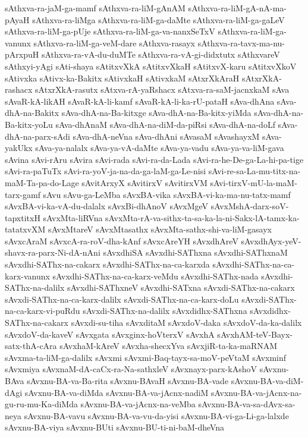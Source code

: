 {sAthxva-ra-jaM-ga-mamf
sAthxva-ra-liM-gAnAM
sAthxva-ra-liM-gA-nA-ma-pAyaH
sAthxva-ra-liMga
sAthxva-ra-liM-ga-daMte
sAthxva-ra-liM-ga-gaLeV
sAthxva-ra-liM-ga-pUje
sAthxva-ra-liM-ga-va-nanxSeTxV
sAthxva-ra-liM-ga-vanunx
sAthxva-ra-liM-ga-veM-dare
sAthxva-rasayx
sAthxva-ra-tavx-ma-nu-pArxpuH
sAthxva-ra-vA-du-duMTe
sAthxva-ra-vA-gi-didxtutx
sAthxvareV
sAthxyi-yAgi
sAti-shaya
sAtitxvXkA
sAtitxvXkaH
sAtitxvX-karu
sAtitxvXkoV
sAtivxka
sAtivx-ka-Bakitx
sAtivxkaH
sAtivxkaM
sAtxrXkAraH
sAtxrXkA-rashacx
sAtxrXkA-rasutx
sAtxva-rA-yaRshacx
sAtxva-ra-saM-jacnxkaM
sAva
sAvaR-kA-likAH
sAvaR-kA-li-kamf
sAvaR-kA-li-ka-rU-pataH
sAva-dhAna
sAva-dhA-na-Bakitx
sAva-dhA-na-Ba-kitxge
sAva-dhA-na-Ba-kitx-yiMda
sAva-dhA-na-Ba-kitx-yoLu
sAva-dhAnaM
sAva-dhA-na-diM-da-piRsi
sAva-dhA-na-doLf
sAva-dhA-na-parx-sAdi
sAva-dhA-neVna
sAva-dhAni
sAvasaM
sAvashayxM
sAva-yakUkx
sAva-ya-nalalx
sAva-ya-vA-daMte
sAva-ya-vadu
sAva-ya-va-liM-gava
sAvina
sAvi-rAru
sAvira
sAvi-rada
sAvi-ra-da-Lada
sAvi-ra-he-De-ga-La-hi-pa-tige
sAvi-ra-paTuTx
sAvi-ra-yoV-ja-na-da-ga-laM-ga-Le-nisi
sAvi-re-sa-La-mu-titx-na-maM-Ta-pa-do-Lage
sAvitArxyX
sAvitirxV
sAvitirxVM
sAvi-tirxV-mU-la-maM-tarx-gamf
sAvu
sAvu-ga-LeMba
sAvxBA-vika
sAvxBA-vi-ka-ma-nu-tatx-mamf
sAvxBA-vi-ka-vA-du-dalalx
sAvxBi-dhAnoV
sAvxMgeV
sAvxMshA-darx-soV-tapxtitxH
sAvxMta-liRVna
sAvxMta-rA-va-sithx-ta-sa-ka-la-ni-Sakx-lA-tamx-ka-tatatxvXM
sAvxMtareV
sAvxMtasathx
sAvxMta-sathx-shi-va-liM-gasayx
sAvxcAraM
sAvxcA-ra-roV-dha-kAnf
sAvxcAreYH
sAvxdhAreV
sAvxdhAyx-yeV-shavx-ra-parx-Ni-dA-nAni
sAvxdhiSA
sAvxdhi-SAThxna
sAvxdhi-SAThxnaM
sAvxdhi-SAThx-na-cakarx
sAvxdhi-SAThx-na-ca-karxda
sAvxdhi-SAThx-na-ca-karx-vanunx
sAvxdhi-SAThx-na-ca-karx-veMdu
sAvxdhi-SAThx-nada
sAvxdhi-SAThx-na-dalilx
sAvxdhi-SAThxneV
sAvxdhi-SATxna
sAvxdi-SAThx-na-cakarx
sAvxdi-SAThx-na-ca-karx-dalilx
sAvxdi-SAThx-na-ca-karx-doLu
sAvxdi-SAThx-na-ca-karx-vi-puRdu
sAvxdi-SAThx-na-dalilx
sAvxdidhx-SAThxna
sAvxdidhx-SAThx-na-cakarx
sAvxdi-su-tiha
sAvxditaM
sAvxdoV-daka
sAvxdoV-da-ka-dalilx
sAvxdoV-da-kaveV
sAvxgata
sAvxginx-hoVterxV
sAvxhA
sAvxhAM-teV-Bayx-satx-thA-cAra
sAvxhaM-kAreV
sAvxha-shecxYva
sAvxjiR-ta-ka-maRNAM
sAvxma-ta-liM-ga-dalilx
sAvxmi
sAvxmi-Baq-tayx-sa-moV-peVtaM
sAvxminf
sAvxmiya
sAvxnaM-dA-caCx-ra-Na-sathxleV
sAvxnayx-parx-kAshoV
sAvxnu-BAva
sAvxnu-BA-va-Ba-rita
sAvxnu-BAvaH
sAvxnu-BA-vade
sAvxnu-BA-va-diM-dAgi
sAvxnu-BA-va-diMda
sAvxnu-BA-va-jAcnx-nadiM
sAvxnu-BA-va-jAcnx-na-gu-ru-mu-Ka-diMda
sAvxnu-BA-va-jAcnx-na-veMba
sAvxnu-BA-va-sa-dAvx-sa-neya
sAvxnu-BA-vavu
sAvxnu-BA-va-vu-da-yisi
sAvxnu-BA-vi-ga-Li-ga-lalxde
sAvxnu-BA-viya
sAvxnu-BUti
sAvxnu-BU-ti-ni-baM-dheVna
}
